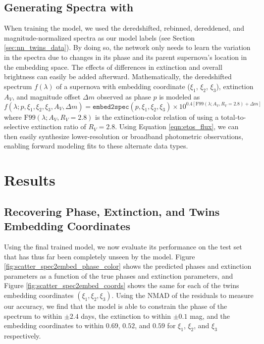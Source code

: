 
\subsection{Generating Spectra with \etos}
When training the \etos{} model, we used the deredshifted, rebinned, dereddened, and magnitude-normalized spectra as our model labels (see Section \ref{sec:nn_twins_data}). By doing so, the network only needs to learn the variation in the spectra due to changes in its phase and its parent supernova's location in the embedding space. The effects of differences in extinction and overall brightness can easily be added afterward. Mathematically, the deredshifted spectrum $f(\lambda)$ of a supernova with embedding coordinate ($\xi_1$, $\xi_2$, $\xi_3$), extinction $A_V$, and magnitude offset $\Delta m$ observed as phase $p$ is modeled as
\begin{equation}
    f(\lambda; p, \xi_1, \xi_2, \xi_3, A_V, \Delta m) = \texttt{embed2spec}(p, \xi_1, \xi_2, \xi_3) \times 10^{0.4 [\text{F99}(\lambda; A_V, R_V=2.8) + \Delta m]}
    \label{eqn:etos_flux}
\end{equation}
where $\text{F99}(\lambda; A_V, R_V=2.8)$ is the extinction-color relation of \citet{fitzpatrick_correcting_1999} using a total-to-selective extinction ratio of $R_V=2.8$. Using Equation \ref{eqn:etos_flux}, we can then easily synthesize lower-resolution or broadband photometric observations, enabling forward modeling fits to these alternate data types.

\section{\stoe{} Results}
\label{sec:spec2embed_results}
\subsection{Recovering Phase, Extinction, and Twins Embedding Coordinates}
Using the final trained \stoe{} model, we now evaluate its performance on the test set that has thus far been completely unseen by the model. Figure \ref{fig:scatter_spec2embed_phase_color} shows the predicted phases and extinction parameters as a function of the true phases and extinction parameters, and Figure \ref{fig:scatter_spec2embed_coords} shows the same for each of the twins embedding coordinates $(\xi_1, \xi_2, \xi_3)$. Using the NMAD of the residuals to measure our accuracy, we find that the model is able to constrain the phase of the spectrum to within $\pm 2.4$ days, the extinction to within $\pm 0.1$ mag, and the embedding coordinates to within $0.69$, $0.52$, and $0.59$ for $\xi_1$, $\xi_2$, and $\xi_3$ respectively.

